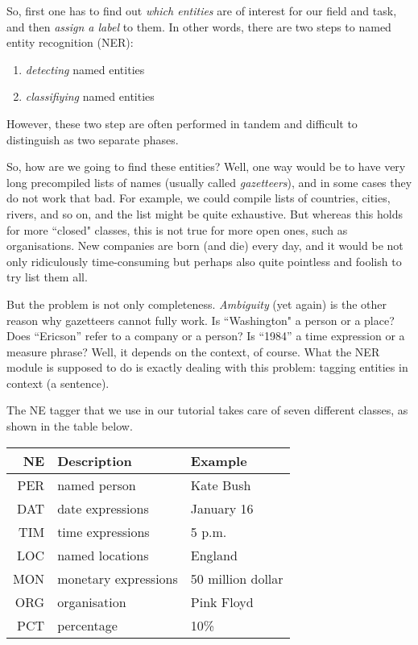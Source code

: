 \documentclass[11pt]{article}
\begin{document}
So, first one has to find out \textit{which entities} are of interest
for our field and task, and then \textit{assign a label} to them. In
other words, there are two steps to named entity recognition (NER):

\begin{enumerate}
\item \textit{detecting} named entities
\item \textit{classifiying} named entities
\end{enumerate}

However, these two step are often performed in tandem and difficult to
distinguish as two separate phases.

So, how are we going to find these entities? Well, one way would be to
have very long precompiled lists of names (usually called
\textit{gazetteers}), and in some cases they do not work that bad. For
example, we could compile lists of countries, cities, rivers, and so
on, and the list might be quite exhaustive. But whereas this holds for
more ``closed" classes, this is not true for more open ones, such as
organisations. New companies are born (and die) every day, and it
would be not only ridiculously time-consuming but perhaps also quite
pointless and foolish to try list them all.

But the problem is not only completeness.  \textit{Ambiguity} (yet
again) is the other reason why gazetteers cannot fully work. Is
``Washington" a person or a place? Does ``Ericson'' refer to a company
or a person?  Is ``1984'' a time expression or a measure phrase? Well,
it depends on the context, of course. What the NER module is supposed
to do is exactly dealing with this problem: tagging entities in
context (a sentence).

The NE tagger that we use in our tutorial takes care of seven
different classes, as shown in the table below.

\begin{center}
\begin{tabular}{|r|l|l|}
\hline
\textbf{NE} & \textbf{Description} & \textbf{Example}\\
\hline
\hline
PER & named person & Kate Bush\\
DAT & date expressions & January 16\\
TIM & time expressions & 5 p.m.\\
LOC & named locations & England\\
MON & monetary expressions & 50 million dollar\\
ORG & organisation & Pink Floyd \\
PCT & percentage & 10\% \\
\hline
\end{tabular}
\end{center}
\end{document}
